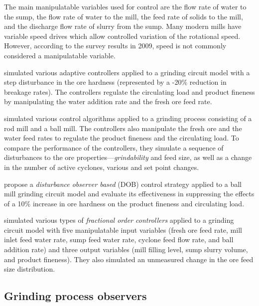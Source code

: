 The main manipulatable variables used for control are the flow rate of water to the sump, the flow rate of water to the mill, the feed rate of solids to the mill, and the discharge flow rate of slurry from the sump. Many modern mills have variable speed drives which allow controlled variation of the rotational speed. However, according to the survey results in 2009, speed is not commonly considered a manipulatable variable.

\cite{najim_adaptive_1995} simulated various adaptive controllers applied to a grinding circuit model with a step disturbance in the ore hardness (represented by a -20\% reduction in breakage rates). The controllers regulate the circulating load and product fineness by manipulating the water addition rate and the fresh ore feed rate.

\cite{pomerleau_survey_2000} simulated various control algorithms applied to a grinding process consisting of a rod mill and a ball mill. The controllers also manipulate the fresh ore and the water feed rates to regulate the product fineness and the circulating load. To compare the performance of the controllers, they simulate a sequence of disturbances to the ore properties---\textit{grindability} and feed size, as well as a change in the number of active cyclones, various and set point changes.

\cite{chen_disturbance_2009} propose a \textit{disturbance observer based} (DOB) control strategy applied to a ball mill grinding circuit model and evaluate its effectiveness in suppressing the effects of a 10\% increase in ore hardness on the product fineness and circulating load.

\cite{aguila-camacho_control_2017} simulated various types of \textit{fractional order controllers} applied to a grinding circuit model with five manipulatable input variables (fresh ore feed rate, mill inlet feed water rate, sump feed water rate, cyclone feed flow rate, and ball addition rate) and three output variables (mill filling level, sump slurry volume, and product fineness). They also simulated an unmeasured change in the ore feed size distribution.


\subsection*{Grinding process observers}


